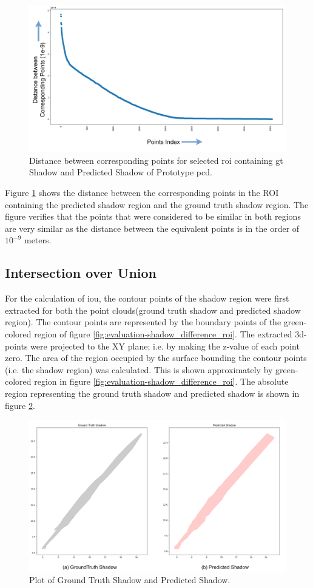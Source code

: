\begin{figure}[htbp]
    \centering
    \includegraphics[width=0.7\linewidth]{97_graphics//evaluation/distn_betn_corresponding_points_in_shadowcasting.pdf}
    \caption{Distance between corresponding points for selected \acrshort{roi} containing \acrshort{gt} Shadow and Predicted Shadow of Prototype \acrshort{pcd}.}
    \label{fig:evaluation-distn_betn_corresponding_points_in_shadowcasting}
\end{figure}

Figure \ref{fig:evaluation-distn_betn_corresponding_points_in_shadowcasting} shows the distance between the corresponding points in the ROI containing the predicted shadow region and the ground truth shadow region. The figure verifies that the points that were considered to be similar in both regions are very similar as the distance between the equivalent points is in the order of \(10^{-9}\) meters.

\subsection{Intersection over Union}
For the calculation of \acrfull{iou}, the contour points of the shadow region were first extracted for both the point clouds(ground truth shadow and predicted shadow region). The contour points are represented by the boundary points of the green-colored region of figure \ref{fig:evaluation-shadow_difference_roi}. The extracted 3d-points were projected to the XY plane; i.e. by making the z-value of each point zero. The area of the region occupied by the surface bounding the contour points (i.e. the shadow region) was calculated. This is shown approximately by green-colored region in figure \ref{fig:evaluation-shadow_difference_roi}. The absolute region representing the ground truth shadow and predicted shadow is shown in figure \ref{fig:evaluation-shadow_gt_pred}.
\begin{figure}[htbp]
    \centering
    \includegraphics[width=0.7\linewidth]{97_graphics//evaluation/shadow_gt_pred.pdf}
    \caption{Plot of Ground Truth Shadow and Predicted Shadow.}
    \label{fig:evaluation-shadow_gt_pred}
\end{figure}

